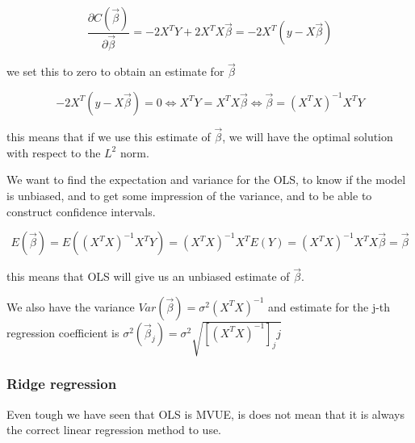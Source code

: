 \documentclass[12pt]{article}
\newcommand{\bbeta}{\vec{\beta}}
\newcommand{\hes}{X^TX}
\begin{document}

\begin{equation}\label{eq:cost_ols_differentiated}
    \frac{\partial C(\bbeta)}{\partial \bbeta} = -2 X^T Y + 2 X^T X \bbeta = -2 X^T (y - X \bbeta)
\end{equation}

we set this to zero to obtain an estimate for $\bbeta$


\begin{equation}\label{eq:optimal_beta_ols}
    -2 X^T (y - X \bbeta) = 0 \iff X^T Y = X^T X \bbeta \iff \bbeta = (X^T X)^{-1} X^T Y
\end{equation}

this means that if we use this estimate of $\bbeta$, we will have the optimal solution with respect to the $L^2$ norm.


We want to find the expectation and variance for the OLS, to know if the model is unbiased, and to get some impression of the variance, and to be able to construct confidence intervals.

\begin{equation}
    E(\bbeta)
    =E((\hes)^{-1}X^T Y)=(\hes)^{-1} X^T E(Y)
    = (\hes)^{-1} \hes \bbeta
    = \bbeta
\end{equation}

this means that OLS will give us an unbiased estimate of $\bbeta$.

We also have the variance $Var(\bbeta)=\sigma^2 (X^TX)^{-1}$ and estimate for the j-th regression coefficient is $\sigma^2(\bbeta_j)=\sigma^2 \sqrt{[(\hes)^{-1}]_jj}$


\subsubsection{Ridge regression}

Even tough we have seen that OLS is MVUE, %
is does not mean that it is always the correct linear regression method to use.
\end{document}
